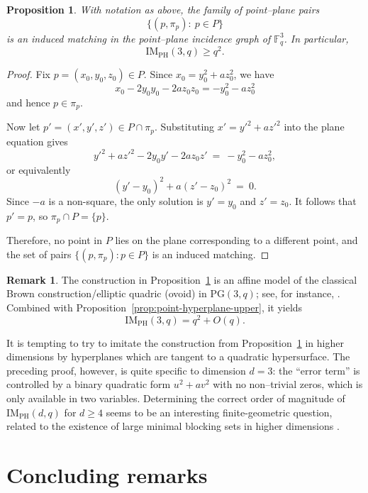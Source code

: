 \documentclass[12pt,reqno]{amsart}
\theoremstyle{plain}
\newtheorem{proposition}[theorem]{Proposition}
\theoremstyle{definition}
\newtheorem{remark}[theorem]{Remark}
\newcommand{\F}{\mathbb{F}}
\newcommand{\IMPH}{\mathrm{IM}_{\mathrm{PH}}}
\newcommand{\1}{\mathbf{1}}
\begin{document}
\begin{proposition}\label{prop:d3-construction}
  With notation as above, the family of point--plane pairs
  \[
    \{(p,\pi_p):\ p\in P\}
  \]
  is an induced matching in the point--plane incidence graph of $\F_q^3$.
  In particular, 
  $$\IMPH(3,q)\ge q^2.$$
\end{proposition}

\begin{proof}
  Fix $p=(x_0,y_0,z_0)\in P$.  Since $x_0=y_0^2+a z_0^2$, we have
  \[
    x_0-2y_0y_0-2a z_0z_0 = -y_0^2-a z_0^2
  \]
  and hence $p\in\pi_p$.

  Now let $p'=(x',y',z')\in P\cap\pi_p$.  Substituting $x'=y'^2+a z'^2$ into the plane equation gives
  \[
    y'^2+a z'^2-2y_0y'-2a z_0z'\ =\ -y_0^2-a z_0^2,
  \]
  or equivalently
  \[
    (y'-y_0)^2+a(z'-z_0)^2\ =\ 0.
  \]
  Since $-a$ is a non-square, the only solution is $y'=y_0$ and $z'=z_0$.  It follows that $p'=p$, so
  $\pi_p\cap P=\{p\}$.

  Therefore, no point in $P$ lies on the plane corresponding to a different point, and the set of
  pairs $\{(p,\pi_p):p\in P\}$ is an induced matching.
\end{proof}

\begin{remark}
  The construction in Proposition~\ref{prop:d3-construction} is an affine model of the classical
  Brown construction/elliptic quadric (ovoid) in $\mathrm{PG}(3,q)$; see, for instance, \cite[Chapter 4.3]{Guth}.
  Combined with Proposition~\ref{prop:point-hyperplane-upper}, it yields
  \[
    \IMPH(3,q)=q^2+O(q).
  \]

It is tempting to try to imitate the construction from Proposition~\ref{prop:d3-construction} in higher dimensions by hyperplanes which are tangent to a quadratic hypersurface.  The preceding proof, however, is quite specific to dimension $d=3$: the ``error term'' is controlled by a binary quadratic form $u^2+a v^2$ with no non--trivial zeros, which is only available in two variables. Determining the correct order of magnitude of $\IMPH(d,q)$ for $d\ge 4$ seems to be an interesting
finite-geometric question, related to the existence of large minimal blocking sets in higher dimensions \cite{MPS07}.
\end{remark}



\section{Concluding remarks}\label{sec:conclusion}
\end{document}

